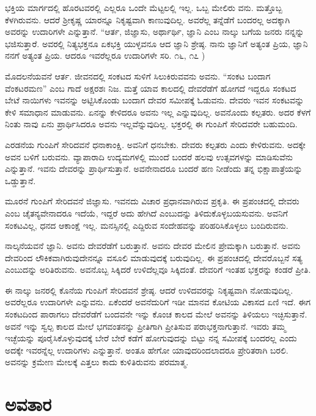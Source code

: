 ಭಕ್ತಿಯ ಮಾರ್ಗದಲ್ಲಿ ಹೊರಟವರಲ್ಲಿ ಎಲ್ಲರೂ ಒಂದೇ ಮೆಟ್ಟಲಲ್ಲಿ ಇಲ್ಲ. ಒಬ್ಬ ಮೇಲಿರು ವನು. ಮತ್ತೊಬ್ಬ ಕೆಳಗಿರುವನು. ಆದರೆ ಶ‍್ರೀಕೃಷ್ಣ ಯಾರನ್ನೂ ನಿಕೃಷ್ಟವಾಗಿ ಕಾಣುವುದಿಲ್ಲ. ಅವರೆಲ್ಲ ತನ್ನೆಡೆಗೆ ಬಂದರಲ್ಲ ಅದಕ್ಕಾಗಿ ಅವರನ್ನು ಉದಾರಿಗಳೇ ಎನ್ನುತ್ತಾನೆ. “ಆರ್ತ, ಜಿಜ್ಞಾಸು, ಅರ್ಥಾರ್ಥಿ, ಜ್ಞಾನಿ ಎಂಬ ನಾಲ್ಕು ಬಗೆಯ ಜನರು ನನ್ನನ್ನು ಭಜಿಸುತ್ತಾರೆ. ಅವರಲ್ಲಿ ನಿತ್ಯಭಕ್ತನೂ ಏಕಭಕ್ತಿ ಯುಳ್ಳವನೂ ಆದ ಜ್ಞಾನಿ ಶ್ರೇಷ್ಠ. ನಾನು ಜ್ಞಾನಿಗೆ ಅತ್ಯಂತ ಪ್ರಿಯ, ಜ್ಞಾನಿ ನನಗೆ ಅತ್ಯಂತ ಪ್ರಿಯ. ಆದರೂ ಇವರೆಲ್ಲರೂ ಉದಾರಿಗಳೇ ಸರಿ. ೧೬, ೧೭ )

ಮೊದಲನೆಯವನೆ ಆರ್ತ. ಜೀವನದಲ್ಲಿ ಸಂಕಟದ ಸುಳಿಗೆ ಸಿಲುಕಿರುವವನು ಅವನು. “ಸಂಕಟ ಬಂದಾಗ ವೆಂಕಟರಮಣ” ಎಂಬ ಗಾದೆ ಅಕ್ಷರಶಃ ನಿಜ. ಮತ್ತೆ ಯಾವ ಕಾಲದಲ್ಲಿ ದೇವರೆಡೆಗೆ ಹೋಗದೆ ಇದ್ದರೂ ಸಂಕಟದ ಬೇಟೆ ನಾಯಿಗಳು ಇವನನ್ನು ಅಟ್ಟಿಸಿಕೊಂಡು ಬಂದಾಗ ದೇವರ ಸಮೀಪಕ್ಕೆ ಓಡುವನು. ದೇವರು ಇವನ ಸಂಕಟವನ್ನು ಕೇಳಿ ಸಮಾಧಾನ ಮಾಡುವನು. ಏನನ್ನು ಕೇಳಿದರೂ ಅವನು ಇಲ್ಲ ಎನ್ನುವುದಿಲ್ಲ. ಅವನೊಂದು ಕಲ್ಪತರು. ಅದರ ಕೆಳಗೆ ನಿಂತು ನಾವು ಏನು ಪ್ರಾರ್ಥಿಸಿದರೂ ಅವನು ಇಲ್ಲವೆನ್ನುವುದಿಲ್ಲ. ಭಕ್ತರಲ್ಲಿ ಈ ಗುಂಪಿಗೆ ಸೇರಿದವರೇ ಬಹುಮಂದಿ.

ಎರಡನೆಯ ಗುಂಪಿಗೆ ಸೇರಿದವನೆ ಧನಾಕಾಂಕ್ಷಿ. ಅವನಿಗೆ ಧನಬೇಕು. ದೇವರು ಕಲ್ಪತರು ಎಂದು ಕೇಳಿರುವನು. ಅದಕ್ಕೇ ಅವನ ಬಳಿಗೆ ಬರುವನು. ವ್ಯಾಪಾರಾದಿ ಉದ್ಯಮಗಳಲ್ಲಿ ಮುಂದೆ ಬಂದರೆ ಹಲವು ಉತ್ಸವಗಳನ್ನು ಮಾಡಿಸುವೆನು ಎನ್ನುತ್ತಾನೆ. ಇವನು ದೇವರನ್ನು ಪ್ರಾರ್ಥಿಸುತ್ತಾನೆ. ಅವನೇನಾದರೂ ಬಂದರೆ ಹಣ ನೀಡೆಂದು ತನ್ನ ಭಿಕ್ಷಾಪಾತ್ರೆಯನ್ನು ಒಡ್ಡುತ್ತಾನೆ.

ಮೂರನೆ ಗುಂಪಿಗೆ ಸೇರಿದವನೆ ಜಿಜ್ಞಾಸು. ಇವನದು ವಿಚಾರ ಪ್ರಧಾನವಾಗಿರುವ ಪ್ರಕೃತಿ. ಈ ಪ್ರಪಂಚದಲ್ಲಿ ದೇವರು ಎಂಬ ಚೈತನ್ಯವೇನಾದರೂ ಇದೆಯೆ, ಇದ್ದರೆ ಅದು ಹೇಗಿದೆ ಎಂಬುದನ್ನು ತಿಳಿದುಕೊಳ್ಳಬಯಸುವನು. ಅವನಿಗೆ ಸಂಕಟವಿಲ್ಲ, ಧನದ ಆಕಾಂಕ್ಷೆ ಇಲ್ಲ. ಮನಸ್ಸಿನಲ್ಲಿ ಎದ್ದಿರುವ ಸಂದೇಹವನ್ನು ಪರಿಹರಿಸಿಕೊಳ್ಳಲು ಬಂದಿರುವನು.

ನಾಲ್ಕನೆಯವನೆ ಜ್ಞಾನಿ. ಅವನು ದೇವರೆಡೆಗೆ ಬರುತ್ತಾನೆ. ಅವನು ದೇವರ ಮೇಲಿನ ಪ್ರೇಮಕ್ಕಾಗಿ ಬರುತ್ತಾನೆ. ಅವನು ದೇವರಿಂದ ಲೌಕಿಕವಾಗಿರುವುದೇನನ್ನೂ ವಸೂಲಿ ಮಾಡುವುದಕ್ಕೆ ಬರುವುದಿಲ್ಲ. ಈ ಪ್ರಪಂಚದಲ್ಲಿ ದೇವರೊಬ್ಬನೆ ಸತ್ಯ ಎಂಬುದನ್ನು ಅರಿತಿರುವನು. ಅವನೊಬ್ಬ ಸಿಕ್ಕಿದರೆ ಉಳಿದೆಲ್ಲವೂ ಸಿಕ್ಕಿದಂತೆ. ದೇವರಿಗೆ ಇಂತಹ ಭಕ್ತರನ್ನು ಕಂಡರೆ ಪ್ರೀತಿ.

ಈ ನಾಲ್ಕು ಜನರಲ್ಲಿ ಕೊನೆಯ ಗುಂಪಿಗೆ ಸೇರಿದವನೆ ಶ್ರೇಷ್ಠ. ಆದರೆ ಉಳಿದವರನ್ನು ನಿಕೃಷ್ಟವಾಗಿ ನೋಡುವುದಿಲ್ಲ. ಅವರೆಲ್ಲರೂ ಉದಾರಿಗಳೇ ಎನ್ನುವನು. ಏಕೆಂದರೆ ಅವನೆದುರಿಗೆ ಇಡೀ ಮಾನವ ಕೋಟಿಯ ವಿಕಾಸದ ಏಣಿ ಇದೆ. ಈಗ ಸಂಕಟದಿಂದ ಪಾರಾಗಲು ದೇವರೆಡೆಗೆ ಬಂದವನೇ ಇನ್ನು ಕೊಂಚ ಕಾಲದ ಮೇಲೆ ಅವನನ್ನು ತಿಳಿಯಲು ಇಚ್ಛಿಸುತ್ತಾನೆ. ಅವನೆ ಇನ್ನು ಸ್ವಲ್ಪ ಕಾಲದ ಮೇಲೆ ಭಗವಂತನನ್ನು ಪ್ರೀತಿಗಾಗಿ ಪ್ರೀತಿಸುವ ಪರಾಭಕ್ತನಾಗುತ್ತಾನೆ. ಇವರು ತಮ್ಮ ಇಚ್ಛೆಯನ್ನು ಪೂರೈಸಿಕೊಳ್ಳುವುದಕ್ಕೆ ಬೇರೆ ಬೇರೆ ಕಡೆಗೆ ಹೋಗುವುದನ್ನು ಬಿಟ್ಟು ನನ್ನ ಸಮೀಪಕ್ಕೆ ಬಂದರಲ್ಲ ಎಂದು ಅದಕ್ಕೇ ಇವರನ್ನೆಲ್ಲ ಉದಾರಿಗಳು ಎನ್ನುತ್ತಾನೆ. ಅಂತೂ ಹೇಗೋ ಯಾವುದರಿಂದಲಾದರೂ ಪ್ರೇರಿತರಾಗಿ ಬರಲಿ. ಅವನನ್ನು ಕ್ರಮೇಣ ಮೇಲಕ್ಕೆ ಎತ್ತಲು ಕಾದು ಕುಳಿತಿರುವನು ಪರಮಾತ್ಮ.


\section*{ಅವತಾರ}

